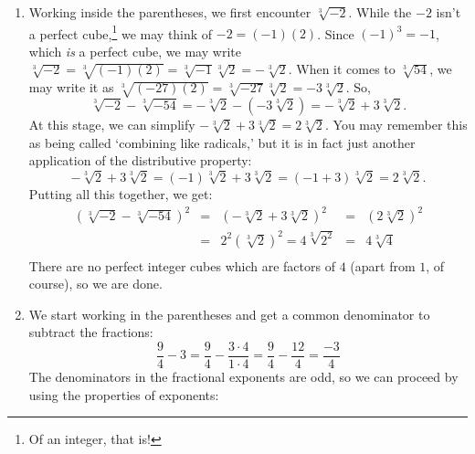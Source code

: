 \begin{ex}
\begin{enumerate}
\item  Working inside the parentheses, we first encounter $\sqrt[3]{-2}$.  While the $-2$ isn't a perfect cube,\footnote{Of an integer, that is!} we may think of $-2 = (-1)(2)$.  Since $(-1)^3 = -1$, which \textit{is} a perfect cube, we may write $\sqrt[3]{-2} = \sqrt[3]{(-1)(2)} = \sqrt[3]{-1} \sqrt[3]{2} = - \sqrt[3]{2}$. When it comes to $\sqrt[3]{54}$, we may write it as $\sqrt[3]{(-27)(2)} = \sqrt[3]{-27} \sqrt[3]{2} = -3 \sqrt[3]{2}$.  So, \[\sqrt[3]{-2} - \sqrt[3]{-54} = -\sqrt[3]{2} - (-3\sqrt[3]{2}) = -\sqrt[3]{2} + 3 \sqrt[3]{2}.\]  At this stage, we can simplify $-\sqrt[3]{2} + 3 \sqrt[3]{2} = 2 \sqrt[3]{2}$.  You may remember this as being called `combining like radicals,' but it is in fact just another application of the distributive property:  \[-\sqrt[3]{2} + 3\sqrt[3]{2} = (-1)\sqrt[3]{2} + 3 \sqrt[3]{2} = (-1+3)\sqrt[3]{2} = 2\sqrt[3]{2}.\]  Putting all this together, we get:\[ \begin{array}{rclcl}
  (\sqrt[3]{-2} - \sqrt[3]{-54})^2 & = & (-\sqrt[3]{2} + 3 \sqrt[3]{2})^2 & = & (2 \sqrt[3]{2})^2  \\ [5pt]
																	 & = & 2^2 (\sqrt[3]{2})^2 = 4 \sqrt[3]{2^2} & = & 4 \sqrt[3]{4} \\ \end{array} \] There are no perfect integer cubes which are factors of $4$ (apart from $1$, of course), so we are done.

\item  We start working in the parentheses and get a common denominator to subtract the fractions:\[ \dfrac{9}{4} - 3 = \dfrac{9}{4} - \dfrac{3 \cdot 4}{1 \cdot 4} = \dfrac{9}{4} - \dfrac{12}{4} = \dfrac{-3}{4}  \] The denominators in the fractional exponents are odd, so we can proceed by using the properties of exponents:


\end{enumerate}
\end{ex}
